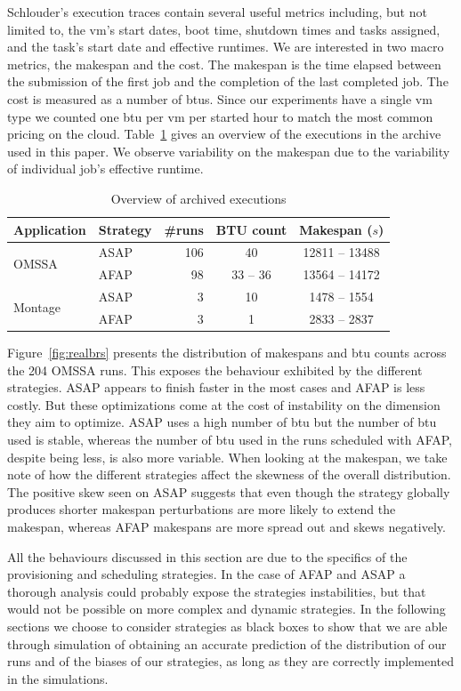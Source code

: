 \documentclass[10pt,conference,compsocconf]{IEEEtran}
\begin{document}
Schlouder's execution traces contain several useful metrics including, but not
limited to, the \ac{vm}'s start dates, boot time, shutdown times and tasks
assigned, and the task's start date and effective runtimes. We are interested in
two macro metrics, the makespan and the cost.  The makespan is the time elapsed
between the submission of the first job and the completion of the last completed
job. The cost is measured as a number of \acp{btu}. Since our experiments have a
single \ac{vm} type we counted one \ac{btu} per \ac{vm} per started hour to
match the most common pricing on the cloud. Table~\ref{tab:nbruns} gives an
overview of the executions in the archive used in this paper. We observe
variability on the makespan due to the variability of individual job's effective
runtime.
\begin{table}
	\centering
	\caption{Overview of archived executions}\label{tab:nbruns}
	\begin{tabular}{llrcc}
		\toprule
		Application&Strategy&\#runs&BTU count&Makespan ($s$)\\
		\midrule
		\multirow{2}{*}{OMSSA}&ASAP&106&40&12811 -- 13488\\
				      &AFAP&98&33 -- 36&13564 -- 14172\\
		\midrule
		\multirow{2}{*}{Montage}&ASAP&3&10&1478 -- 1554\\
					&AFAP&3&1&2833 -- 2837\\
		\bottomrule
	\end{tabular}
\end{table}


Figure~\ref{fig:realbrs} presents the distribution of makespans and \ac{btu}
counts across the 204 OMSSA runs. This exposes the behaviour exhibited by the
different strategies. ASAP appears to finish faster in the most cases and AFAP
is less costly. But these optimizations come at the cost of instability on the
dimension they aim to optimize. ASAP uses a high number of \ac{btu} but the
number of \ac{btu} used is stable, whereas the number of \ac{btu} used in the
runs scheduled with AFAP, despite being less, is also more variable. When
looking at the makespan, we take note of how the different strategies affect the
skewness of the overall distribution. The positive skew seen on ASAP suggests
that even though the strategy globally produces shorter makespan perturbations
are more likely to extend the makespan, whereas AFAP makespans are more spread
out and skews negatively.

All the behaviours discussed in this section are due to the specifics of the
provisioning and scheduling strategies. In the case of AFAP and ASAP a thorough
analysis could probably expose the strategies instabilities, but that would not
be possible on more complex and dynamic strategies. In the following sections we
choose to consider strategies as black boxes to show that we are able through
simulation of obtaining an accurate prediction of the distribution of our runs
and of the biases of our strategies, as long as they are correctly implemented
in the simulations.
\end{document}
